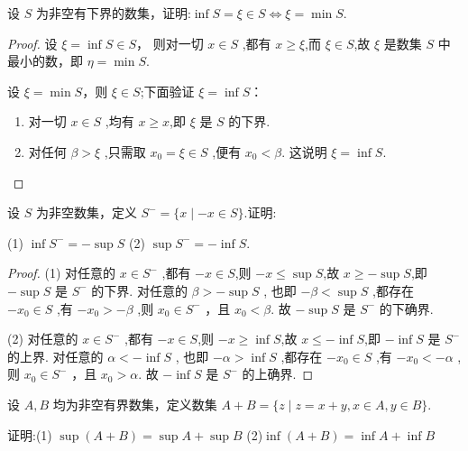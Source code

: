 \begin{practice}
    设 $S$ 为非空有下界的数集，证明:$\inf S=\xi \in S \iff \xi =\min S$.
\end{practice}
\begin{proof}
    \renewcommand{\theenumi}{\roman{enumi}}
    \renewcommand{\labelenumi}{\normalfont (\theenumi)}
    \biyao 设 $\xi = \inf S \in S$， 则对一切 $x\in S$ ,都有 $x\ge \xi$,而 $\xi \in S$,故 $\xi$ 是数集 $S$ 中最小的数，即 $\eta=\min S$.

    \chongfen 设 $\xi=\min S$，则 $\xi\in S$;下面验证 $\xi = \inf S$：
    \begin{enumerate}
        \item 对一切 $x \in S$ ,均有 $x\ge x$,即 $\xi$ 是 $S$ 的下界.
        \item 对任何 $\beta > \xi$ ,只需取 $x_0=\xi\in S$ ,便有 $x_0< \beta$. 这说明 $\xi=\inf S$.
    \end{enumerate}
\end{proof}

\begin{practice}
    设 $S$ 为非空数集，定义 $S^-=\{ x\mid -x \in S\}$.证明:

    (1) $\inf S^-=-\sup S$ \qquad (2) $\sup S^- = -\inf S$.
\end{practice}

\begin{proof}
    (1) 对任意的 $x\in S^-$ ,都有 $-x\in S$,则 $-x\le \sup S$,故 $x\ge -\sup S$,即 $-\sup S$ 是 $S^-$ 的下界. 对任意的 $\beta>-\sup S$ , 也即 $-\beta < \sup S$ ,都存在 $-x_0\in S$ ,有 $-x_0 > -\beta$ ,则 $x_0\in S^-$ ，且 $x_0 < \beta$. 故 $-\sup S$ 是 $S^-$ 的下确界.

    (2) 对任意的 $x\in S^-$ ,都有 $-x\in S$,则 $-x\ge \inf S$,故 $x\le -\inf S$,即 $-\inf S$ 是 $S^-$ 的上界. 对任意的 $\alpha<-\inf S$ , 也即 $-\alpha > \inf S$ ,都存在 $-x_0\in S$ ,有 $-x_0 < -\alpha$ ,则 $x_0\in S^-$ ，且 $x_0 > \alpha$. 故 $-\inf S$ 是 $S^-$ 的上确界.
\end{proof}

\begin{practice}
    设 $A,B$ 均为非空有界数集，定义数集 $A+B=\{z\mid z=x+y,x\in A,y\in B\}$.

    证明:(1) $\sup (A+B) = \sup A+\sup B$ 
    \qquad (2)$\inf (A+B) = \inf A+\inf B$ 
\end{practice}

